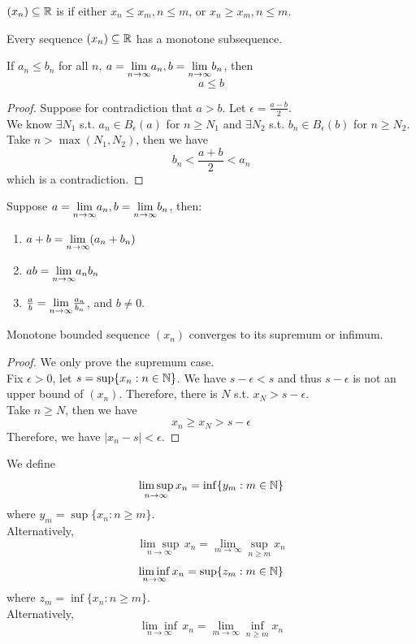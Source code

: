 \documentclass[11pt]{article}
\begin{document}
$(x_n) \subseteq \mathbb{R}$ is  if either $x_n \leq x_m, n \leq m$, or $x_n \geq x_m, n \leq m$.

Every sequence $(x_n) \subseteq \mathbb{R}$ has a monotone subsequence.

\fact If $a_n \leq b_n$ for all $n$, $a = \underset{n \rightarrow \infty}{\lim} a_n, b = \underset{n \rightarrow \infty}{\lim} b_n$, then 
$$a \leq b$$

\begin{proof}
	Suppose for contradiction that $a > b$. Let $\epsilon = \frac{a - b}{2}$.\\
	We know $\exists N_1$ s.t. $a_n \in B_\epsilon(a)$ for $n \geq N_1$ and $\exists N_2$ s.t. $b_n \in B_\epsilon(b)$ for $n \geq N_2$. Take $n > \max(N_1, N_2)$, then we have
	$$b_n < \frac{a+b}{2} < a_n$$
	which is a contradiction.
\end{proof}

 Suppose $a = \underset{n \rightarrow \infty}{\lim} a_n, b = \underset{n \rightarrow \infty}{\lim} b_n$, then:
\begin{enumerate}
	\item $a + b = \underset{n \rightarrow \infty}{\lim} (a_n + b_n)$
	\item $ab = \underset{n \rightarrow \infty}{\lim} a_nb_n$
	\item $\frac{a}{b} = \underset{n \rightarrow \infty}{\lim} \frac{a_n}{b_n}$, and $b \neq 0$.
\end{enumerate}

\fact Monotone bounded sequence $(x_n)$ converges to its supremum or infimum.
\begin{proof}
	We only prove the supremum case. \\
	Fix $\epsilon > 0$, let $s = \sup\{x_n: n \in \mathbb{N}\}$. We have 
	$s - \epsilon < s$ and thus $s - \epsilon$ is not an upper bound of $(x_n)$. Therefore, there is $N$ s.t. $x_N > s-\epsilon$. \\
	Take $n \geq N$, then we have
	$$x_n \geq x_N > s-\epsilon$$
	Therefore, we have $|x_n - s| < \epsilon$.
\end{proof}

We define
$$\underset{n \rightarrow \infty}{\lim \sup}\, x_n = \inf\{y_m:m \in \mathbb{N}\}$$
where $y_m = \sup\{x_n: n\geq m\}$. \\
Alternatively,
$$\underset{n \rightarrow \infty}{\lim \sup}\, x_n = \underset{m \rightarrow \infty}{\lim} \underset{n \geq m}{\sup} x_n$$
$$\underset{n \rightarrow \infty}{\lim \inf}\, x_n = \sup\{z_m:m \in \mathbb{N}\}$$
where $z_m = \inf\{x_n: n\geq m\}$.\\
Alternatively,
$$\underset{n \rightarrow \infty}{\lim \inf}\, x_n = \underset{m \rightarrow \infty}{\lim} \underset{n \geq m}{\inf} x_n$$
\end{document}
